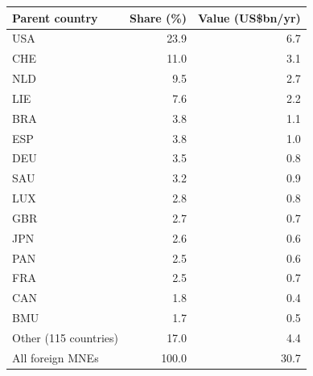 \begin{tabular}{lrr}
\toprule
Parent country & Share (\%) & Value (US\$bn/yr) \\
\midrule
USA & 23.9 & 6.7 \\
CHE & 11.0 & 3.1 \\
NLD & 9.5 & 2.7 \\
LIE & 7.6 & 2.2 \\
BRA & 3.8 & 1.1 \\
ESP & 3.8 & 1.0 \\
DEU & 3.5 & 0.8 \\
SAU & 3.2 & 0.9 \\
LUX & 2.8 & 0.8 \\
GBR & 2.7 & 0.7 \\
JPN & 2.6 & 0.6 \\
PAN & 2.5 & 0.6 \\
FRA & 2.5 & 0.7 \\
CAN & 1.8 & 0.4 \\
BMU & 1.7 & 0.5 \\
Other (115 countries) & 17.0 & 4.4 \\
\midrule
All foreign MNEs & 100.0 & 30.7 \\
\bottomrule
\end{tabular}
